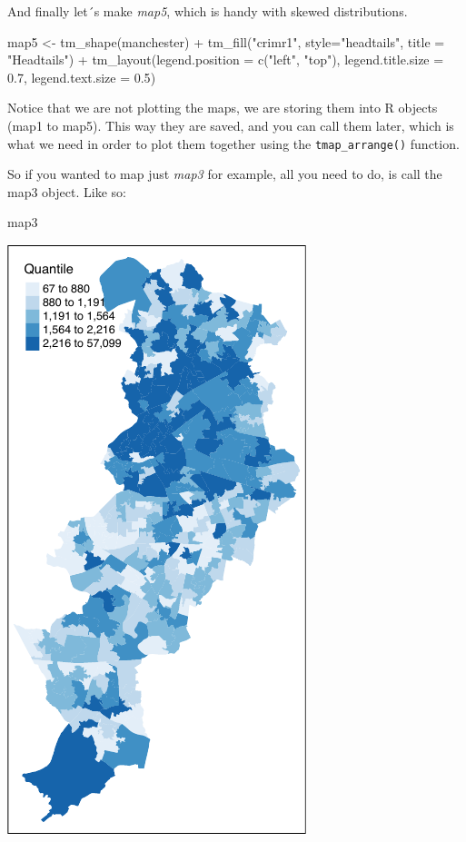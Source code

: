 \documentclass[
  krantz2]{krantz}
\makeatletter
\newenvironment{Shaded}{\begin{snugshade}}{\end{snugshade}}
\newcommand{\AttributeTok}[1]{\textcolor[rgb]{0.61,0.61,0.61}{#1}}
\newcommand{\FloatTok}[1]{\textcolor[rgb]{0.06,0.06,0.06}{#1}}
\newcommand{\FunctionTok}[1]{\textcolor[rgb]{0,0,0}{#1}}
\newcommand{\NormalTok}[1]{#1}
\newcommand{\OtherTok}[1]{\textcolor[rgb]{0.37,0.37,0.37}{#1}}
\newcommand{\SpecialCharTok}[1]{\textcolor[rgb]{0,0,0}{#1}}
\newcommand{\StringTok}[1]{\textcolor[rgb]{0.5,0.5,0.5}{#1}}
\newenvironment{kframe}{%
\medskip{}
\setlength{\fboxsep}{.8em}
 \def\at@end@of@kframe{}%
 \ifinner\ifhmode%
  \def\at@end@of@kframe{\end{minipage}}%
  \begin{minipage}{\columnwidth}%
 \fi\fi%
 \def\FrameCommand##1{\hskip\@totalleftmargin \hskip-\fboxsep
 \colorbox{shadecolor}{##1}\hskip-\fboxsep
     \hskip-\linewidth \hskip-\@totalleftmargin \hskip\columnwidth}%
 \MakeFramed {\advance\hsize-\width
   \@totalleftmargin\z@ \linewidth\hsize
   \@setminipage}}%
 {\par\unskip\endMakeFramed%
 \at@end@of@kframe}
\renewenvironment{Shaded}{\begin{kframe}}{\end{kframe}}
\makeatother
\begin{document}
And finally let´s make \emph{map5}, which is handy with skewed distributions.

\begin{Shaded}
\begin{Highlighting}[]
\NormalTok{map5 }\OtherTok{\textless{}{-}} \FunctionTok{tm\_shape}\NormalTok{(manchester) }\SpecialCharTok{+} 
  \FunctionTok{tm\_fill}\NormalTok{(}\StringTok{"crimr1"}\NormalTok{, }\AttributeTok{style=}\StringTok{"headtails"}\NormalTok{, }\AttributeTok{title =} \StringTok{"Headtails"}\NormalTok{) }\SpecialCharTok{+}
  \FunctionTok{tm\_layout}\NormalTok{(}\AttributeTok{legend.position =} \FunctionTok{c}\NormalTok{(}\StringTok{"left"}\NormalTok{, }\StringTok{"top"}\NormalTok{), }
            \AttributeTok{legend.title.size =} \FloatTok{0.7}\NormalTok{, }\AttributeTok{legend.text.size =} \FloatTok{0.5}\NormalTok{)}
\end{Highlighting}
\end{Shaded}

Notice that we are not plotting the maps, we are storing them into R objects (map1 to map5). This way they are saved, and you can call them later, which is what we need in order to plot them together using the \texttt{tmap\_arrange()} function.

So if you wanted to map just \emph{map3} for example, all you need to do, is call the map3 object. Like so:

\begin{Shaded}
\begin{Highlighting}[]
\NormalTok{map3}
\end{Highlighting}
\end{Shaded}

\includegraphics{crime_mapping_files/figure-latex/unnamed-chunk-100-1.pdf}
\end{document}
